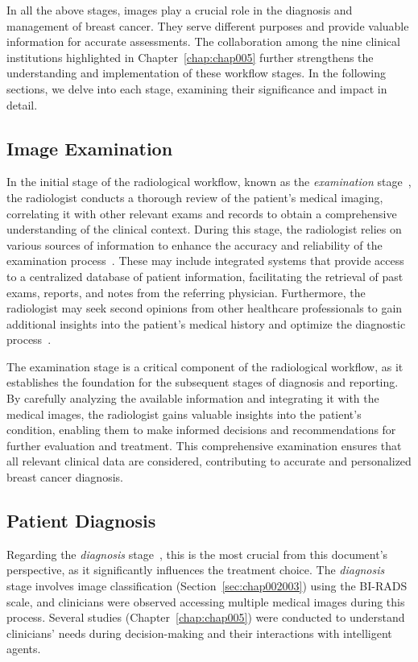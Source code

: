 In all the above stages, images play a crucial role in the diagnosis and management of breast cancer.
They serve different purposes and provide valuable information for accurate assessments.
The collaboration among the nine clinical institutions highlighted in Chapter~\ref{chap:chap005} further strengthens the understanding and implementation of these workflow stages.
In the following sections, we delve into each stage, examining their significance and impact in detail.

\subsection{Image Examination}
\label{sec:app001005001}

In the initial stage of the radiological workflow, known as the {\it examination} stage~\cite{8621479}, the radiologist conducts a thorough review of the patient's medical imaging, correlating it with other relevant exams and records to obtain a comprehensive understanding of the clinical context.
During this stage, the radiologist relies on various sources of information to enhance the accuracy and reliability of the examination process~\cite{islam2018recent, DIROBERTO2016950}.
These may include integrated systems that provide access to a centralized database of patient information, facilitating the retrieval of past exams, reports, and notes from the referring physician.
Furthermore, the radiologist may seek second opinions from other healthcare professionals to gain additional insights into the patient's medical history and optimize the diagnostic process~\cite{GIBSON2018113}.

The examination stage is a critical component of the radiological workflow, as it establishes the foundation for the subsequent stages of diagnosis and reporting.
By carefully analyzing the available information and integrating it with the medical images, the radiologist gains valuable insights into the patient's condition, enabling them to make informed decisions and recommendations for further evaluation and treatment.
This comprehensive examination ensures that all relevant clinical data are considered, contributing to accurate and personalized breast cancer diagnosis.

\subsection{Patient Diagnosis}
\label{sec:app001005002}

Regarding the {\it diagnosis} stage~\cite{https://doi.org/10.1002/cncr.32872}, this is the most crucial from this document's perspective, as it significantly influences the treatment choice.
The {\it diagnosis} stage involves image classification (Section~\ref{sec:chap002003}) using the \ac{BI-RADS} scale, and clinicians were observed accessing multiple medical images during this process.
Several studies (Chapter~\ref{chap:chap005}) were conducted to understand clinicians' needs during decision-making and their interactions with intelligent agents.

